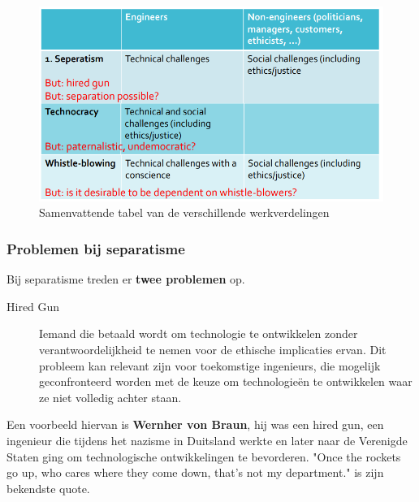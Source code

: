 \documentclass[../summary.tex]{subfiles}
\begin{document}
	\begin{figure}[H]
		\centering
		\includegraphics[width=0.8\linewidth]{../images/division-of-labour-table}
		\caption{Samenvattende tabel van de verschillende werkverdelingen}
		\label{fig:division-of-labour-table}
	\end{figure}
	\newpage
		
	\subsubsection{Problemen bij separatisme}
	Bij separatisme treden er \textbf{twee problemen} op.
	\begin{description}
		\item[Hired Gun] Iemand die betaald wordt om technologie te ontwikkelen zonder verantwoordelijkheid te nemen voor de ethische implicaties ervan. Dit probleem kan relevant  zijn voor toekomstige ingenieurs, die mogelijk geconfronteerd worden met de keuze om technologieën te ontwikkelen waar ze niet volledig achter staan.
	\end{description}
	Een voorbeeld hiervan is \textbf{Wernher von Braun}, hij was een hired gun, een ingenieur die tijdens het nazisme in Duitsland werkte en later naar de Verenigde Staten ging om technologische ontwikkelingen te bevorderen. "Once the rockets go up, who cares where they come down, that's not my department." is zijn bekendste quote.
	
\end{document}
